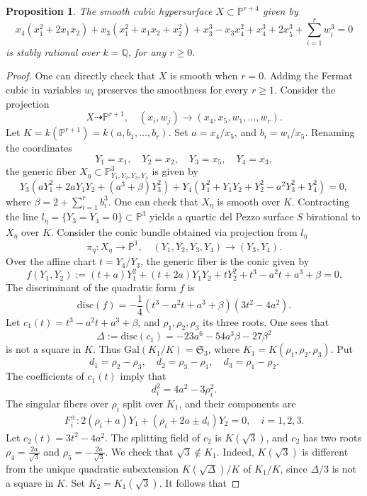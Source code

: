 \documentclass[12pt, reqno]{amsart}
\theoremstyle{plain}
\newtheorem{prop}{Proposition}[section]
\theoremstyle{remark}
\theoremstyle{definition}
\numberwithin{equation}{section}
\def\disc{{\mathrm{disc}}}
\def\fS{{\mathfrak S}}
\def\fS{{\mathfrak S}}
\def\bP{{\mathbb P}}
\def\bQ{{\mathbb Q}}
\def\Gal{\mathrm{Gal}}
\begin{document}
\begin{prop}
    \label{prop:cubictypeI3}
    The smooth cubic hypersurface $X\subset\bP^{r+4}$ given by
    $$
    x_4(x_1^2+2x_1x_2)+x_3(x_1^2+x_1x_2+x_2^2)+x_3^3-x_3x_4^2+x_4^3+2x_5^3+\sum_{i=1}^rw_i^3=0
    $$
    is stably rational over $k=\bQ$, for any $r\geq 0.$
\end{prop}
\begin{proof}
  One can directly check that
$X$ is smooth when $r=0$. Adding the Fermat cubic in variables $w_i$ preserves the smoothness for every $r\geq 1$. Consider the projection 
    $$
    X\dashrightarrow \bP^{r+1},\quad (x_i,w_j)\to (x_4,x_5,w_1,\ldots,w_r).
    $$
    Let $K=k(\bP^{r+1})=k(a,b_1,\ldots,b_r)$. Set $a=x_4/x_5$, and $b_i=w_i/x_5$. Renaming the coordinates 
    $$
    Y_1=x_1,\quad Y_2=x_2, \quad Y_3=x_5,\quad Y_4=x_3,
    $$
 the generic fiber $X_\eta\subset\bP^3_{Y_1,Y_2,Y_3,Y_4}$ is given by
$$
Y_3(aY_1^2+2aY_1Y_2+(a^3+\beta)Y_3^2)+Y_4(Y_1^2+Y_1Y_2+Y_2^2-a^2Y_3^2+Y_4^2)=0,
$$
where $\beta=2+\sum_{i=1}^rb_i^3$. One can check that $X_\eta$ is smooth over $K$. Contracting the line $l_\eta=\{Y_3=Y_4=0\}\subset\bP^3$ yields a quartic del Pezzo surface $S$ birational to $X_\eta$ over $K$. Consider the  conic bundle obtained via projection from $l_\eta$
$$
\pi_\eta:X_\eta\to\bP^1,\quad (Y_1,Y_2,Y_3,Y_4)\to (Y_3,Y_4).
$$
Over the affine chart $t=Y_4/Y_3$, the generic fiber is the conic given by 
$$
f(Y_1,Y_2):=(t + a)Y_1^2 + (t + 2a)Y_1Y_2 + tY_2^2 + t^3 -a^2t + a^3 + \beta=0.
$$
The discriminant of the quadratic form $f$ is 
$$
\mathrm{disc}(f)=-\frac14(t^3-a^2t+a^3+\beta)(3t^2-4a^2).
$$
Let $c_1(t)=t^3-a^2t+a^3+\beta$, and $\rho_1,\rho_2,\rho_3$ its three roots. One sees that
$$
\Delta:=\disc(c_1)=-23a^6 - 54a^3\beta - 27\beta^2
$$
is not a square in $K$. Thus $\Gal(K_1/K)=\fS_3$, where $K_1=K(\rho_1,\rho_2,\rho_3)$. Put 
$$
d_1=\rho_2-\rho_3,\quad d_2=\rho_3-\rho_1,\quad d_3=\rho_1-\rho_2.
$$
The coefficients of $c_1(t)$ imply that 
$$
d_i^2=4a^2-3\rho_i^2.
$$
The singular fibers over $\rho_i$ split over $K_1$, and their components are
\begin{align}\label{eqn:I3fiber1}
F_i^\pm:    2(\rho_i+a)Y_1+(\rho_i+2a\pm d_i)Y_2=0,\quad i=1,2,3.
\end{align}
Let $c_2(t)=3t^2-4a^2$. The splitting field of $c_2$ is $K(\sqrt{3})$, and $c_2$ has two roots 
$\rho_4=\frac{2a}{\sqrt3}$ and $\rho_5=-\frac{2a}{\sqrt3}$. We check that $\sqrt{3}\notin K_1$. Indeed, $K(\sqrt 3)$ is different from the unique quadratic subextension $K(\sqrt{\Delta})/K$ of $K_1/K$, since ${\Delta/3}$ is  not a square in $K$. Set $K_2=K_1(\sqrt 3)$. It follows that

\end{proof}
\end{document}
